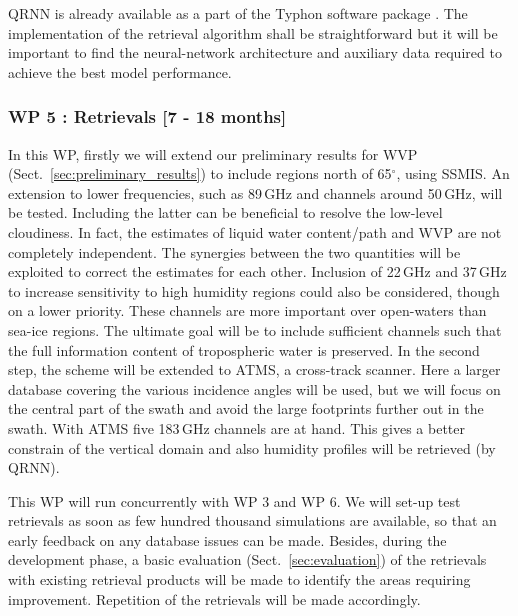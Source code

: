 \documentclass[12pt,oneside,a4paper]{article}
\begin{document}
QRNN is already available as a part of the Typhon software package
\citep{lemke:2020:typhon}. The implementation of the retrieval algorithm shall
be straightforward but it will be important to find the
neural-network architecture and auxiliary data required to achieve the best model performance.



\vspace{-1.0ex}
\subsubsection*{WP 5 : Retrievals [7 - 18 months]}
%
\label{sec:retrievals}
%
In this WP, firstly we will extend our preliminary results for WVP
(Sect.~\ref{sec:preliminary_results}) to include regions north of 65$^\circ$,
using SSMIS. An extension to lower frequencies, such as 89\,GHz and channels
around 50\,GHz, will be tested. Including the latter can be beneficial to
resolve the low-level cloudiness. In fact, the estimates of liquid water
content/path and WVP are not completely independent. The synergies between the
two quantities will be exploited to correct the estimates for each other.
Inclusion of 22\,GHz and 37\,GHz to increase sensitivity to high humidity
regions could also be considered, though on a lower priority. These channels
are more important over open-waters than sea-ice regions. The ultimate goal
will be to include sufficient channels such that the full information content
of tropospheric water is preserved. In the second step, the scheme will be
extended to ATMS, a cross-track scanner. Here a larger database covering the
various incidence angles will be used, but we will focus on the central part of
the swath and avoid the large footprints further out in the swath. With ATMS
five 183\,GHz channels are at hand. This gives a better constrain of the
vertical domain and also humidity profiles will be retrieved (by QRNN).

This WP will run concurrently with WP 3 and WP 6. We will set-up test retrievals as soon as few hundred thousand simulations are available, so that an early feedback on any database issues can be made. Besides, during the development phase, a basic evaluation (Sect.~\ref{sec:evaluation}) of the retrievals with existing retrieval products will be made to identify the areas requiring improvement. Repetition of the retrievals will be made accordingly.
\end{document}

